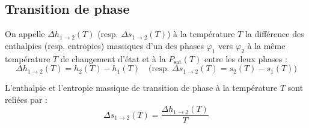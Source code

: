 \subsection{Transition de phase}

\begin{definition}
On appelle  $\Delta h_{1 \to 2}(T)$ (resp.  $\Delta s_{1 \to 2}(T)$) à la température $T$ la différence des enthalpies (resp. entropies) massiques d'un  des phases $\varphi_1$ vers $\varphi_2$ à la même température $T$ de changement d'état et à la  $P_{\mathrm{sat}}(T)$ entre les deux phases :
\[\Delta h_{1 \to 2}(T) = h_2(T) - h_1(T) \quad \text{(resp. } \Delta s_{1 \to 2}(T) = s_2(T) - s_1(T) \text{)}\]
\end{definition}

\begin{propriete}
L'enthalpie et l'entropie massique de transition de phase à la température $T$ sont reliées par :
\[\Delta s_{1 \to 2}(T) = \frac{\Delta h_{1 \to 2}(T)}{T}\]
\end{propriete}